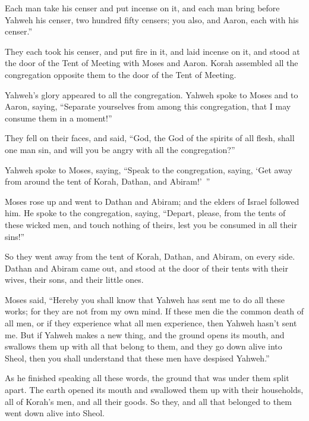 {Each man take his censer and put incense on it, and each man bring before Yahweh his censer, two hundred fifty censers; you also, and Aaron, each with his censer.”
\par }{\PP {}They each took his censer, and put fire in it, and laid incense on it, and stood at the door of the Tent of Meeting with Moses and Aaron.
Korah assembled all the congregation opposite them to the door of the Tent of Meeting.
\par }{\PP Yahweh’s glory appeared to all the congregation.
Yahweh spoke to Moses and to Aaron, saying,
“Separate yourselves from among this congregation, that I may consume them in a moment!”
\par }{\PP {}They fell on their faces, and said, “God, the God of the spirits of all flesh, shall one man sin, and will you be angry with all the congregation?”
\par }{\PP {}Yahweh spoke to Moses, saying,
“Speak to the congregation, saying, ‘Get away from around the tent of Korah, Dathan, and Abiram!’ ”
\par }{\PP {}Moses rose up and went to Dathan and Abiram; and the elders of Israel followed him.
He spoke to the congregation, saying, “Depart, please, from the tents of these wicked men, and touch nothing of theirs, lest you be consumed in all their sins!”
\par }{\PP {}So they went away from the tent of Korah, Dathan, and Abiram, on every side. Dathan and Abiram came out, and stood at the door of their tents with their wives, their sons, and their little ones.
\par }{\PP {}Moses said, “Hereby you shall know that Yahweh has sent me to do all these works; for they are not from my own mind.
If these men die the common death of all men, or if they experience what all men experience, then Yahweh hasn’t sent me.
But if Yahweh makes a new thing, and the ground opens its mouth, and swallows them up with all that belong to them, and they go down alive into Sheol, then you shall understand that these men have despised Yahweh.”
\par }{\PP {}As he finished speaking all these words, the ground that was under them split apart.
The earth opened its mouth and swallowed them up with their households, all of Korah’s men, and all their goods.
So they, and all that belonged to them went down alive into Sheol.
}
